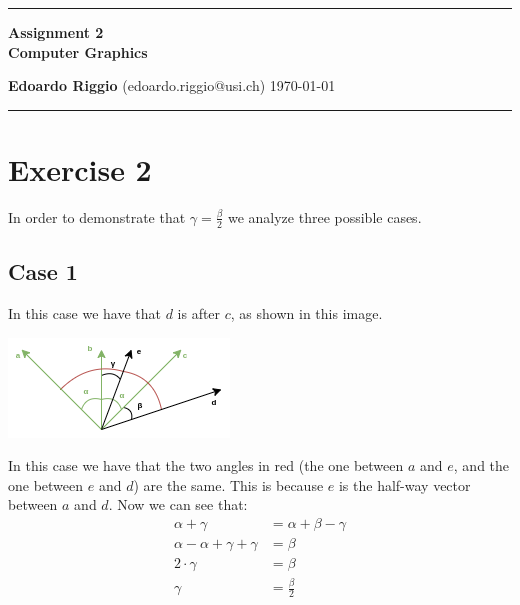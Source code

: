 \documentclass{article}
\begin{document}
\begin{center}
\hrule

\vspace{.4cm}
{\bf {\Huge Assignment 2}} \\
\vspace{.2cm}
{\bf Computer Graphics}
\vspace{.2cm}
\end{center}
{\bf Edoardo Riggio } (edoardo.riggio@usi.ch) \hspace{\fill}  \today \\
\hrule
\vspace{.2cm}

\section*{Exercise 2}
In order to demonstrate that $\gamma = \frac{\beta}{2}$ we analyze three possible cases.

\subsection*{Case 1}
In this case we have that $d$ is after $c$, as shown in this image. \\
\begin{center}
  \includegraphics{./diagram_1.png}
\end{center}
In this case we have that the two angles in red (the one between $a$ and $e$, and the one between $e$ and $d$) are the same. This is because $e$ is the half-way vector between $a$ and $d$. Now we can see that:
\begin{align*}
  \alpha + \gamma & = \alpha + \beta - \gamma \\
  \alpha - \alpha + \gamma + \gamma & = \beta \\
  2 \cdot \gamma & = \beta \\
  \gamma & = \displaystyle\frac{\beta}{2}
\end{align*}
\end{document}
